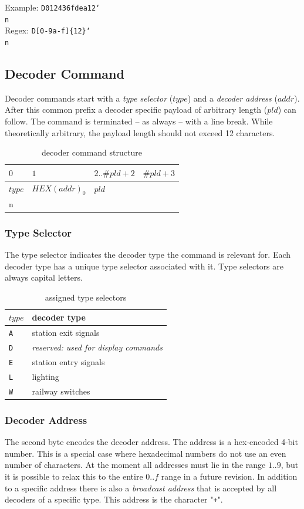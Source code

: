 \documentclass{scrreprt}
\newcommand\n{\char`\\n}
\begin{document}
Example: \texttt{D012436fdea12\n}\\
Regex: \texttt{D[0-9a-f]\{12\}\n}

\subsection{Decoder Command}
Decoder commands start with a \emph{type selector} ($type$) and a \emph{decoder address} ($addr$).
After this common prefix a decoder specific payload of arbitrary length ($pld$) can follow.
The command is terminated -- as always -- with a line break.
While theoretically arbitrary, the payload length should not exceed 12 characters.

\begin{table}[h!]
\centering
\begin{tabular}{ |l|l|l|l| } 
\multicolumn{1}{l}{$0$} & \multicolumn{1}{l}{$1$} & \multicolumn{1}{l}{$2..\#pld+2$} & \multicolumn{1}{l}{$\#pld+3$} \\ \hline
$type$ & $HEX(addr)_0$ & $pld$ & \texttt{\n} \\\hline
\end{tabular}
\caption{decoder command structure}
\end{table}

\subsubsection{Type Selector}
The type selector indicates the decoder type the command is relevant for.
Each decoder type has a unique type selector associated with it.
Type selectors are always capital letters.

\begin{table}[ht!]
\centering
\begin{tabular}{ |l|l| }
\hline
$type$ & decoder type \\\hline\hline
\texttt{A} & station exit signals \\\hline
\texttt{D} & \emph{reserved: used for display commands} \\\hline
\texttt{E} & station entry signals \\\hline
\texttt{L} & lighting \\\hline
\texttt{W} & railway switches \\\hline
\end{tabular}
\caption{assigned type selectors}
\end{table}

\subsubsection{Decoder Address}
The second byte encodes the decoder address.
The address is a hex-encoded 4-bit number.
This is a special case where hexadecimal numbers do not use an even number of characters.
At the moment all addresses must lie in the range $1..9$, but it is possible to relax this to the entire $0..f$ range in a future revision.
In addition to a specific address there is also a \emph{broadcast address} that is accepted by all decoders of a specific type.
This address is the character "\texttt{+}".
\end{document}
